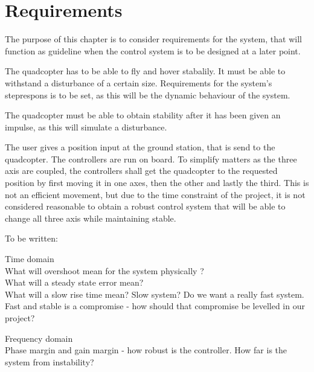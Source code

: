 \chapter{Requirements}
The purpose of this chapter is to consider requirements for the system, that will function as guideline when the control system is to be designed at a later point.

The quadcopter has to be able to fly and hover stabalily. It must be able to withstand a disturbance of a certain size. 
Requirements for the system's steprespons  is to be set, as this will be the dynamic behaviour of the system. 

The quadcopter must be able to obtain stability after it has been given an impulse, as this will simulate a disturbance.

The user gives a position input at the ground station, that is send to the quadcopter. The controllers are run on board. To simplify matters as the three axis are coupled, the controllers shall get the quadcopter to the requested position by first moving it in one axes, then the other and lastly the third. This is not an efficient movement, but due to the time constraint of the project, it is not considered reasonable to obtain a robust control system that will be able to change all three axis while maintaining stable. 

To be written:

Time domain\\
What will overshoot mean for the system physically ? \\
What will a steady state error mean? \\
What will a slow rise time mean? Slow system? Do we want a really fast system. Fast and stable is a compromise - how should that compromise be levelled in our project? 

Frequency domain\\
Phase margin and gain margin - how robust is the controller. How far is the system from instability? 


